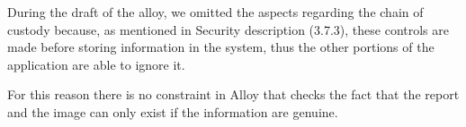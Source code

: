 During the draft of the alloy, we omitted the aspects regarding the chain of custody because, as mentioned in Security description (3.7.3), these controls are made before storing information in the system, thus the other portions of the application are able to ignore it.

For this reason there is no constraint in Alloy that checks the fact that the report and the image can only exist if the information are genuine.